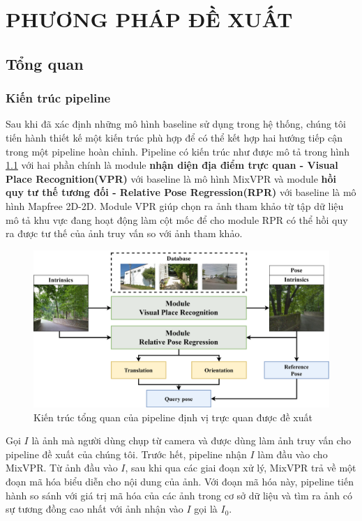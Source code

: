 \chapter{PHƯƠNG PHÁP ĐỀ XUẤT}

\section{Tổng quan}
\subsection{Kiến trúc pipeline}
Sau khi đã xác định những mô hình baseline sử dụng trong hệ thống, chúng tôi tiến hành thiết kế một kiến trúc phù hợp để có thể kết hợp hai hướng tiếp cận trong một pipeline hoàn chỉnh. Pipeline có kiến trúc như được mô tả trong hình \ref{fig:arch} với hai phần chính là module \textbf{nhận diện địa điểm trực quan - Visual Place Recognition(VPR)} với baseline là mô hình MixVPR và module \textbf{hồi quy tư thế tương đối - Relative Pose Regression(RPR)} với baseline là mô hình Mapfree 2D-2D. Module VPR giúp chọn ra ảnh tham khảo từ tập dữ liệu mô tả khu vực đang hoạt động làm cột mốc để cho module RPR có thể hồi quy ra được tư thế của ảnh truy vấn so với ảnh tham khảo.

\begin{figure}[htbp]
    \centering
    \includegraphics[width=\textwidth]{pics/Proposal/arch.png}
    \caption{Kiến trúc tổng quan của pipeline định vị trực quan được đề xuất}
    \label{fig:arch}
\end{figure}

Gọi $I$ là ảnh mà người dùng chụp từ camera và được dùng làm ảnh truy vấn cho pipeline đề xuất của chúng tôi. Trước hết, pipeline nhận $I$ làm đầu vào cho MixVPR. Từ ảnh đầu vào $I$, sau khi qua các giai đoạn xử lý, MixVPR trả về một đoạn mã hóa biểu diễn cho nội dung của ảnh. Với đoạn mã hóa này, pipeline tiến hành so sánh với giá trị mã hóa của các ảnh trong cơ sở dữ liệu và tìm ra ảnh có sự tương đồng cao nhất với ảnh nhận vào $I$ gọi là $I_0$.


